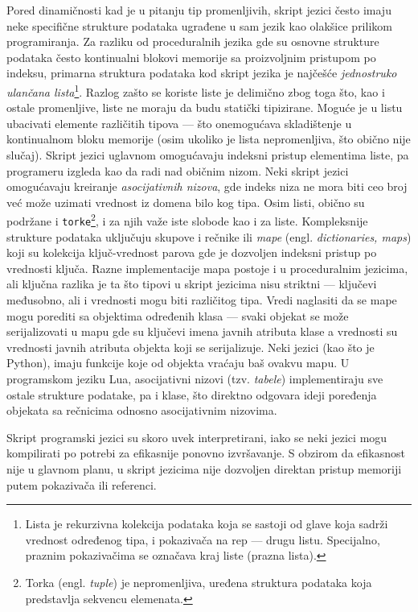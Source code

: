 Pored dinamičnosti kad je u pitanju tip promenljivih, skript jezici često imaju neke specifične strukture podataka ugrađene u sam jezik kao olakšice prilikom programiranja. Za razliku od proceduralnih jezika gde su osnovne strukture podataka često kontinualni blokovi memorije sa proizvoljnim pristupom po indeksu, primarna struktura podataka kod skript jezika je najčešće \emph{jednostruko ulančana lista}\footnote{Lista je rekurzivna kolekcija podataka koja se sastoji od glave koja sadrži vrednost određenog tipa, i pokazivača na rep --- drugu listu. Specijalno, praznim pokazivačima se označava kraj liste (prazna lista).}. Razlog zašto se koriste liste je delimično zbog toga što, kao i ostale promenljive, liste ne moraju da budu statički tipizirane. Moguće je u listu ubacivati elemente različitih tipova --- što onemogućava skladištenje u kontinualnom bloku memorije (osim ukoliko je lista nepromenljiva, što obično nije slučaj). Skript jezici uglavnom omogućavaju indeksni pristup elementima liste, pa programeru izgleda kao da radi nad običnim nizom. Neki skript jezici omogućavaju kreiranje \emph{asocijativnih nizova}, gde indeks niza ne mora biti ceo broj već može uzimati vrednost iz domena bilo kog tipa. Osim listi, obično su podržane i \texttt{torke}\footnote{Torka (engl. \emph{tuple}) je nepromenljiva, uređena struktura podataka koja predstavlja sekvencu elemenata.}, i za njih važe iste slobode kao i za liste. Kompleksnije strukture podataka uključuju skupove i rečnike ili \emph{mape} (engl. \emph{dictionaries, maps}) koji su kolekcija ključ-vrednost parova gde je dozvoljen indeksni pristup po vrednosti ključa. Razne implementacije mapa postoje i u proceduralnim jezicima, ali ključna razlika je ta što tipovi u skript jezicima nisu striktni --- ključevi međusobno, ali i vrednosti mogu biti različitog tipa. Vredi naglasiti da se mape mogu porediti sa objektima određenih klasa --- svaki objekat se može serijalizovati u mapu gde su ključevi imena javnih atributa klase a vrednosti su vrednosti javnih atributa objekta koji se serijalizuje. Neki jezici (kao što je Python), imaju funkcije koje od objekta vraćaju baš ovakvu mapu. U programskom jeziku Lua, asocijativni nizovi (tzv. \emph{tabele}) implementiraju sve ostale strukture podatake, pa i klase, što direktno odgovara ideji poređenja objekata sa rečnicima odnosno asocijativnim nizovima.

Skript programski jezici su skoro uvek interpretirani, iako se neki jezici mogu kompilirati po potrebi za efikasnije ponovno izvršavanje. S obzirom da efikasnost nije u glavnom planu, u skript jezicima nije dozvoljen direktan pristup memoriji putem pokazivača ili referenci. 


